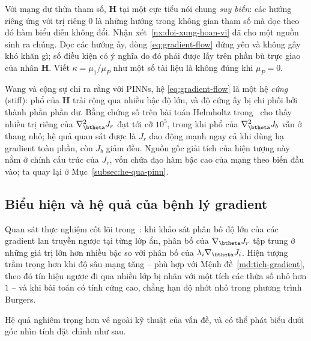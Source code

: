 \begin{nhanxet}
Với mạng dư thừa tham số, $\bm{H}$ tại một cực tiểu nói chung \emph{suy biến}:
các hướng riêng ứng với trị riêng $0$ là những hướng trong không gian tham số mà
dọc theo đó hàm biểu diễn không đổi. Nhận xét~\ref{nx:doi-xung-hoan-vi} đã cho
một nguồn sinh ra chúng. Dọc các hướng ấy, dòng \eqref{eq:gradient-flow} đứng
yên và không gây khó khăn gì; số điều kiện có ý nghĩa do đó phải được lấy trên
phần bù trực giao của nhân $\bm{H}$. Viết $\kappa = \mu_1/\mu_P$ như một số tài
liệu là không đúng khi $\mu_P = 0$.
\end{nhanxet}
 
Wang và cộng sự chỉ ra rằng với PINNs, hệ \eqref{eq:gradient-flow} là một hệ
\emph{cứng} (stiff): phổ của $\bm{H}$ trải rộng qua nhiều bậc độ lớn, và độ cứng
ấy bị chi phối bởi thành phần phần dư. Bằng chứng số trên bài toán Helmholtz
trong~\cite{wang2021} cho thấy nhiều trị riêng của $\nabla^2_{\btheta}J_r$ đạt
tới cỡ $10^{5}$, trong khi phổ của $\nabla^2_{\btheta}J_b$ vẫn ở thang nhỏ; hệ
quả quan sát được là $J_r$ dao động mạnh ngay cả khi dùng hạ gradient toàn phần,
còn $J_b$ giảm đều. Nguồn gốc giải tích của hiện tượng này nằm ở chính cấu trúc
của $J_r$, vốn chứa đạo hàm bậc cao của mạng theo biến đầu vào; ta quay lại ở
Mục~\ref{subsec:he-qua-pinn}.
 
\subsection{Biểu hiện và hệ quả của bệnh lý gradient}
\label{subsec:bieu-hien}
 
Quan sát thực nghiệm cốt lõi trong~\cite{wang2021}: khi khảo sát phân bố độ lớn
của các gradient lan truyền ngược tại từng lớp ẩn, phân bố của
$\nabla_{\btheta} J_{r}$ tập trung ở những giá trị lớn hơn nhiều bậc so với phân
bố của $\lambda_{i} \nabla_{\btheta} J_{i}$. Hiện tượng trầm trọng hơn khi độ sâu
mạng tăng -- phù hợp với Mệnh đề~\ref{md:tich-gradient}, theo đó tín hiệu ngược
đi qua nhiều lớp bị nhân với một tích các thừa số nhỏ hơn $1$ -- và khi bài toán
có tính cứng cao, chẳng hạn độ nhớt nhỏ trong phương trình Burgers.
 
Hệ quả nghiêm trọng hơn vẻ ngoài kỹ thuật của vấn đề, và có thể phát biểu dưới
góc nhìn tính đặt chỉnh như sau.
 

